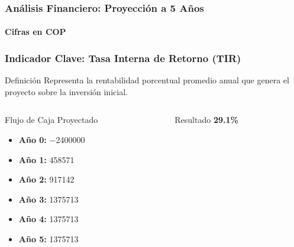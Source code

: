 \begin{frame}
  \frametitle{Análisis Financiero: Proyección a 5 Años}
  \framesubtitle{Cifras en COP}

\end{frame}

\begin{frame}
  \frametitle{Indicador Clave: Tasa Interna de Retorno (TIR)}

  \begin{block}{Definición}
    Representa la rentabilidad porcentual promedio anual que genera el
    proyecto sobre la inversión inicial.
  \end{block}

  \begin{columns}[T]
    \begin{column}{0.5\textwidth}
      \begin{block}{Flujo de Caja Proyectado}
        \begin{itemize}
          \item \textbf{Año 0:} \num{-2400000}
          \item \textbf{Año 1:} \num{458571}
          \item \textbf{Año 2:} \num{917142}
          \item \textbf{Año 3:} \num{1375713}
          \item \textbf{Año 4:} \num{1375713}
          \item \textbf{Año 5:} \num{1375713}
        \end{itemize}
      \end{block}
    \end{column}
    \begin{column}{0.5\textwidth}
      \begin{alertblock}{Resultado}
        \centering
        \Huge{\textbf{29.1\%}}
      \end{alertblock}
    \end{column}
  \end{columns}
\end{frame}

